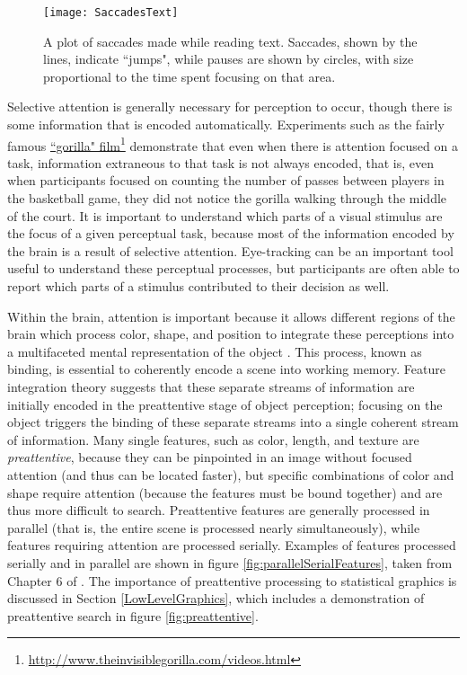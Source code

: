 \documentclass[11pt]{isuthesis}\usepackage[]{graphicx}\usepackage[]{color}
\begin{document}
\begin{figure}[htbp]
\centering
\texttt{[image: SaccadesText]}
\caption[Saccades and pauses]{A plot of saccades made while reading text. Saccades, shown by the lines, indicate ``jumps", while pauses are shown by circles, with size proportional to the time spent focusing on that area.}\label{fig:saccadestext}
\end{figure}

Selective attention is generally necessary for perception to occur, though there is some information that is encoded automatically. Experiments such as the fairly famous \href{http://www.theinvisiblegorilla.com/videos.html}{``gorilla" film}\footnote{\url{http://www.theinvisiblegorilla.com/videos.html}} demonstrate that even when there is attention focused on a task, information extraneous to that task is not always encoded, that is, even when participants focused on counting the number of passes between players in the basketball game, they did not notice the gorilla walking through the middle of the court. It is important to understand which parts of a visual stimulus are the focus of a given perceptual task, because most of the information encoded by the brain is a result of selective attention. Eye-tracking can be an important tool useful to understand these perceptual processes, but participants are often able to report which parts of a stimulus contributed to their decision as well.

Within the brain, attention is important because it allows different regions of the brain which process color, shape, and position to integrate these perceptions into a multifaceted mental representation of the object \citep{goldstein}. This process, known as binding, is essential to coherently encode a scene into working memory. Feature integration theory \citep{treisman1980feature} suggests that these separate streams of information are initially encoded in the preattentive stage of object perception; focusing on the object triggers the binding of these separate streams into a single coherent stream of information. Many single features, such as color, length, and texture are \emph{preattentive}, because they can be pinpointed in an image without focused attention (and thus can be located faster), but specific combinations of color and shape require attention (because the features must be bound together) and are thus more difficult to search. Preattentive features are generally processed in parallel (that is, the entire scene is processed nearly simultaneously), while features requiring attention are processed serially. Examples of features processed  serially and in parallel are shown in figure \ref{fig:parallelSerialFeatures}, taken from Chapter 6 of \citet{helander1997handbook}. The importance of preattentive processing to statistical graphics is discussed in Section \ref{LowLevelGraphics}, which includes a demonstration of preattentive search in figure \ref{fig:preattentive}. 
\end{document}
